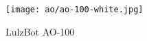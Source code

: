 

\begin{figure}[h!]
\texttt{[image: ao/ao-100-white.jpg]}
 \caption{LulzBot AO-100}
 \label{fig:ao-100-1-white}
\end{figure}

